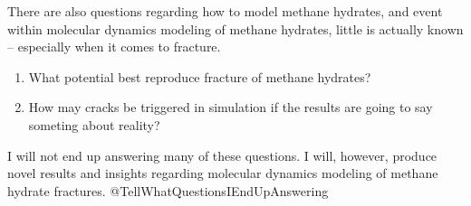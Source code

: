There are also questions regarding how to model methane hydrates, and event within molecular dynamics modeling of methane hydrates, little is actually known -- especially when it comes to fracture. 

\begin{enumerate}
\item What potential best reproduce fracture of methane hydrates?
\item How may cracks be triggered in simulation if the results are going to say someting about reality?
\end{enumerate}

I will not end up answering many of these questions. I will, however, produce novel results and insights regarding molecular dynamics modeling of methane hydrate fractures.
@TellWhatQuestionsIEndUpAnswering